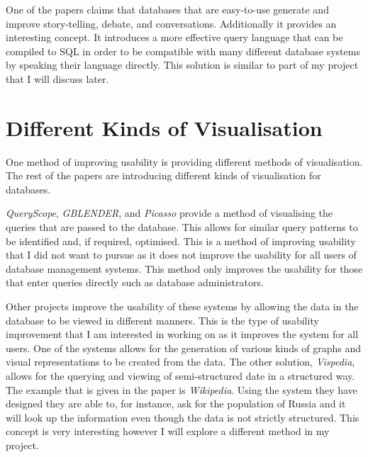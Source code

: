 One of the papers\cite{Stolte2010} claims that databases that are easy-to-use
generate and improve story-telling, debate, and conversations. Additionally it
provides an interesting concept. It introduces a more effective query language
that can be compiled to SQL in order to be compatible with many different
database systems by speaking their language directly. This solution is similar
to part of my project that I will discuss later.

\section{Different Kinds of Visualisation}

One method of improving usability is providing different methods of
visualisation. The rest of the
papers\cite{Hu2008,Haritsa2010,Yang2010,Jin2010,Chan2009} are introducing
different kinds of visualisation for databases.

\emph{QueryScope}\cite{Hu2008}, \emph{GBLENDER}\cite{Jin2010}, and
\emph{Picasso}\cite{Haritsa2010} provide a method of visualising the queries
that are passed to the database. This allows for similar query patterns to be
identified and, if required, optimised. This is a method of improving usability
that I did not want to pursue as it does not improve the usability for all
users of database management systems. This method only improves the usability
for those that enter queries directly such as database administrators.

Other projects\cite{Yang2010,Chan2009} improve the usability of these systems
by allowing the data in the database to be viewed in different manners. This is
the type of usability improvement that I am interested in working on as it
improves the system for all users. One of the systems\cite{Yang2010} allows for
the generation of various kinds of graphs and visual representations to be
created from the data. The other solution, \emph{Vispedia}\cite{Chan2009},
allows for the querying and viewing of semi-structured date in a structured
way. The example that is given in the paper is \emph{Wikipedia}. Using the
system they have designed they are able to, for instance, ask for the
population of Russia and it will look up the information even though the data
is not strictly structured. This concept is very interesting however I will
explore a different method in my project.
